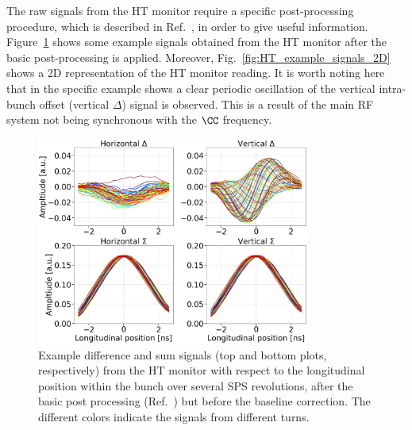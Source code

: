 The raw signals from the HT monitor require a specific post-processing procedure, which is described in Ref.~\cite{Levens:2313358}, in order to give useful information. Figure~\ref{fig:HT_example_signals} shows some example signals obtained from the HT monitor after the basic post-processing is applied. Moreover, Fig.~\ref{fig:HT_example_signals_2D} shows a 2D representation of the HT monitor reading. It is worth noting here that in the specific example shows a clear periodic oscillation of the vertical intra-bunch offset (vertical $\Delta$) signal is observed. This is a result of the main RF system not being synchronous with the  $\CC$  frequency. 



\begin{figure}[!h]
   \centering         
   \includegraphics[width=0.8\textwidth]{images/Ch4/HT_1D__20180530_135105exampleAcq_4thesis_turnsStart0_Stop6000_step100_new.png}
       \caption{Example difference and sum signals (top and bottom plots, respectively) from the HT monitor with respect to the longitudinal position within the bunch over several SPS revolutions, after the basic post processing (Ref.~\cite{Levens:2313358}) but before the baseline correction. The different colors indicate the signals from different turns.}
       \label{fig:HT_example_signals}
\end{figure}

